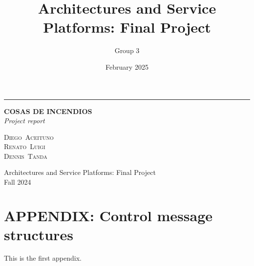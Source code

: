 \documentclass[a4paper,11pt]{article}
\title{Architectures and Service Platforms: Final Project}
\author{Group 3}
\date{February 2025}
\begin{document}
\begin{titlepage}
    \raggedleft
    \rule{2pt}{\textheight}
    \hspace{0.05\textwidth}
    \parbox[b]{0.9\textwidth}{
            {\Huge\bfseries COSAS DE INCENDIOS}\\[\baselineskip] %
            {\Large\textit{Project report}}\\[7\baselineskip] %
        \vspace{0.45\textheight}
        
        {\Large\textsc{Diego\ Aceituno\\
                        Renato\ Luigi\\
                        Dennis\ Tanda}}\\[1.5\baselineskip]
        \vspace{0.05\textheight}
        
        {\noindent\large Architectures and Service Platforms: Final Project}\\
        {\noindent\large Fall 2024}\\
    }
\end{titlepage}
\clearpage
\pagestyle{fancy}
\fancyfoot{}
\fancyhead[L]{}
\fancyfoot[L]{}
\fancyfoot[R]{\thepage}
\setcounter{tocdepth}{2}
\tableofcontents
\clearpage
\thispagestyle{indicefig}
\listoffigures
\listoftables
\clearpage

\clearpage
{}

\clearpage
{}

\clearpage
{}

\clearpage
{}

\clearpage
{}

\clearpage
{}

\clearpage
{}

\clearpage
{}

\clearpage
{}
\printbibliography[title={REFERENCES}, heading=bibnumbered]
\clearpage
{}
\section{APPENDIX: Control message structures}
\label{appendix}
This is the first appendix.
%
\end{document}
